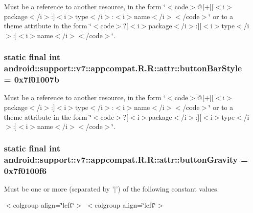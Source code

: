 Must be a reference to another resource, in the form \char`\"{}$<$code$>$@\mbox{[}+\mbox{]}\mbox{[}$<$i$>$package$<$/i$>$:\mbox{]}$<$i$>$type$<$/i$>$:$<$i$>$name$<$/i$>$$<$/code$>$\char`\"{} or to a theme attribute in the form \char`\"{}$<$code$>$?\mbox{[}$<$i$>$package$<$/i$>$:\mbox{]}\mbox{[}$<$i$>$type$<$/i$>$:\mbox{]}$<$i$>$name$<$/i$>$$<$/code$>$\char`\"{}. \hypertarget{classandroid_1_1support_1_1v7_1_1appcompat_1_1_r_1_1attr_a41719f2188892d801063f19156cc429}{
\subsubsection[{buttonBarStyle}]{\setlength{\rightskip}{0pt plus 5cm}static final int android::support::v7::appcompat.R.R::attr::buttonBarStyle = 0x7f01007b}}
\label{classandroid_1_1support_1_1v7_1_1appcompat_1_1_r_1_1attr_a41719f2188892d801063f19156cc429}


Must be a reference to another resource, in the form \char`\"{}$<$code$>$@\mbox{[}+\mbox{]}\mbox{[}$<$i$>$package$<$/i$>$:\mbox{]}$<$i$>$type$<$/i$>$:$<$i$>$name$<$/i$>$$<$/code$>$\char`\"{} or to a theme attribute in the form \char`\"{}$<$code$>$?\mbox{[}$<$i$>$package$<$/i$>$:\mbox{]}\mbox{[}$<$i$>$type$<$/i$>$:\mbox{]}$<$i$>$name$<$/i$>$$<$/code$>$\char`\"{}. \hypertarget{classandroid_1_1support_1_1v7_1_1appcompat_1_1_r_1_1attr_a2c7770429139646a27230628dd10ec5}{
\subsubsection[{buttonGravity}]{\setlength{\rightskip}{0pt plus 5cm}static final int android::support::v7::appcompat.R.R::attr::buttonGravity = 0x7f0100f6}}
\label{classandroid_1_1support_1_1v7_1_1appcompat_1_1_r_1_1attr_a2c7770429139646a27230628dd10ec5}


Must be one or more (separated by '$|$') of the following constant values. \begin{TabularC}{0}
\hline
\end{TabularC}
$<$colgroup align=\char`\"{}left\char`\"{}$>$ $<$colgroup align=\char`\"{}left\char`\"{}$>$ 

